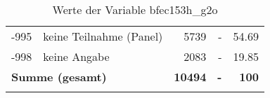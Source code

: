 \begin{longtable}{Xlrrr}
       -995 & keine Teilnahme (Panel) & \num{5739} & - & \num[round-mode=places,round-precision=2]{54.69} \\

       -998 & keine Angabe & \num{2083} & - & \num[round-mode=places,round-precision=2]{19.85} \\

     \midrule
     \multicolumn{2}{l}{\textbf{Summe (gesamt)}} & \textbf{\num{10494}} & \textbf{-} & \textbf{\num{100}} \\
     \bottomrule
     \caption{Werte der Variable bfec153h\_g2o}
     \end{longtable}
     
